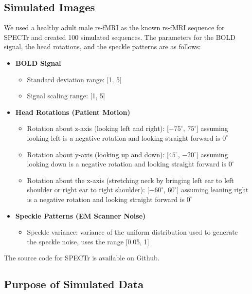 \subsection{Simulated Images}

We used a healthy adult male rs-fMRI as the known rs-fMRI sequence for SPECTr and created 100 simulated sequences. The parameters for the BOLD signal, the head rotations, and the speckle patterns are as follows:

\begin{itemize}
\item \textbf{BOLD Signal}
	\begin{itemize}
	\item Standard deviation range: [1, 5] %
	\item Signal scaling range: [1, 5] %
	\end{itemize}
\item \textbf{Head Rotations (Patient Motion)}
	\begin{itemize}
	\item Rotation about z-axis (looking left and right): [$-75^{\circ}$, $75^{\circ}$] assuming looking left is a negative rotation and looking straight forward is $0^{\circ}$ %
	\item Rotation about y-axis (looking up and down): [$45^{\circ}$, $-20^{\circ}$] assuming looking down is a negative rotation and looking straight forward is $0^{\circ}$ %
	\item Rotation about the x-axis (stretching neck by bringing left ear to left shoulder or right ear to right shoulder): [$-60^{\circ}$, $60^{\circ}$] assuming leaning right is a negative rotation and looking straight forward is $0^{\circ}$ %
	\end{itemize}
\item \textbf{Speckle Patterns (EM Scanner Noise)}
	\begin{itemize}
	\item Speckle variance: variance of the uniform distribution used to generate the speckle noise, uses the range [0.05, 1] %
	\end{itemize}
\end{itemize}

The source code for SPECTr is available on Github. %

\subsection{Purpose of Simulated Data}

